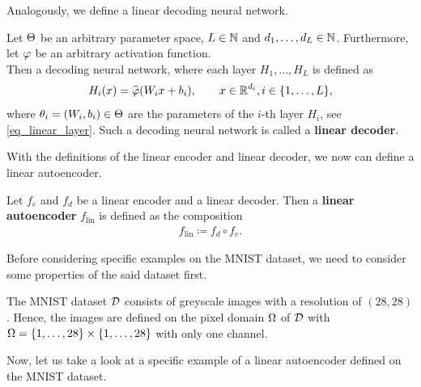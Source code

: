 Analogously, we define a linear decoding neural network.

\begin{definition}\label{def_linear_decoder}
Let $\operatorname{\Theta}$ be an arbitrary parameter space, $L\in \operatorname{\mathbb{N}}$ and $d_1,\ldots,d_L \in \operatorname{\mathbb{N}}$. Furthermore, let $\operatorname{\varphi}$ be an arbitrary activation function.\\
Then a decoding neural network, where each layer $H_1,\ldots, H_L$ is defined as
\begin{align*}
H_i(x) = \widehat{\operatorname{\varphi}}(W_ix + b_i), \qquad x \in \operatorname{\mathbb{R}}^{d_i}, i \in \{1,\ldots, L\},
\end{align*}
where $\theta_i=(W_i, b_i)\in\operatorname{\Theta}$ are the parameters of the $i$-th layer $H_i$, see \eqref{eq_linear_layer}. Such a decoding neural network is called a \textbf{linear decoder}.
\end{definition}


With the definitions of the linear encoder and linear decoder, we now can define a linear autoencoder.


\begin{definition}
Let $f_e$ and $f_d$ be a linear encoder and a linear decoder. Then a \textbf{linear autoencoder} $f_{\text{lin}}$ is defined as the composition
\begin{align*}
f_{\text{lin}} \coloneqq f_d \circ f_e.
\end{align*}
\end{definition}

Before considering specific examples on the MNIST dataset, we need to consider some properties of the said dataset first.

\begin{remark}\label{def:mnist}
The MNIST dataset $\operatorname{\mathcal{D}}$ consists of greyscale images with a resolution of $(28,28)$. Hence, the images are defined on the pixel domain $\Omega$ of $\operatorname{\mathcal{D}}$ with $\Omega=\{1,\ldots,28\}\times\{1,\ldots,28\}$ with only one channel.
\end{remark}

Now, let us take a look at a specific example of a linear autoencoder defined on the MNIST dataset.

